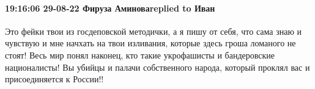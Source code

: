  
 
 
 
 

\paragraph{19:16:06 29-08-22 Фируза Аминоваreplied to Иван}

Это фейки твои из госдеповской методички, а я пишу от себя, что сама знаю и
чувствую и мне начхать на твои изливания, которые здесь гроша ломаного не
стоят! Весь мир понял наконец, кто такие укрофашисты и бандеровские
националисты! Вы убийцы и палачи собственного народа, который проклял вас и
присоединяется к России!!
